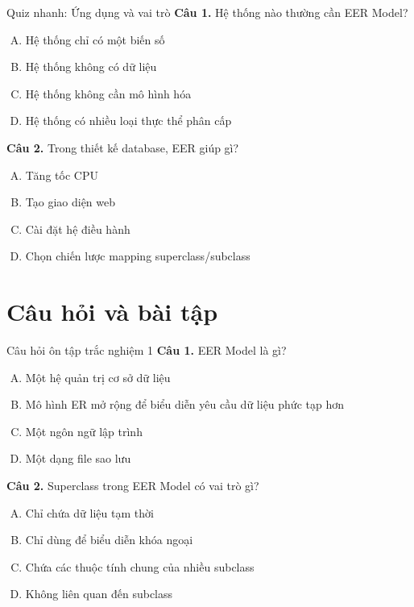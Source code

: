 \documentclass[aspectratio=169,11pt]{beamer}
\begin{document}
\begin{frame}{Quiz nhanh: Ứng dụng và vai trò}
\textbf{Câu 1.} Hệ thống nào thường cần EER Model?
\begin{enumerate}[A.]
    \item Hệ thống chỉ có một biến số
    \item Hệ thống không có dữ liệu
    \item Hệ thống không cần mô hình hóa
    \item Hệ thống có nhiều loại thực thể phân cấp
\end{enumerate}
\vspace{0.2cm}
\textbf{Câu 2.} Trong thiết kế database, EER giúp gì?
\begin{enumerate}[A.]
    \item Tăng tốc CPU
    \item Tạo giao diện web
    \item Cài đặt hệ điều hành
    \item Chọn chiến lược mapping superclass/subclass
\end{enumerate}
\end{frame}

\section{Câu hỏi và bài tập}

\begin{frame}{Câu hỏi ôn tập trắc nghiệm 1}
\textbf{Câu 1.} EER Model là gì?
\begin{enumerate}[A.]
    \item Một hệ quản trị cơ sở dữ liệu
    \item Mô hình ER mở rộng để biểu diễn yêu cầu dữ liệu phức tạp hơn
    \item Một ngôn ngữ lập trình
    \item Một dạng file sao lưu
\end{enumerate}

\vspace{0.2cm}
\textbf{Câu 2.} Superclass trong EER Model có vai trò gì?
\begin{enumerate}[A.]
    \item Chỉ chứa dữ liệu tạm thời
    \item Chỉ dùng để biểu diễn khóa ngoại
    \item Chứa các thuộc tính chung của nhiều subclass
    \item Không liên quan đến subclass
\end{enumerate}
\end{frame}
\end{document}
